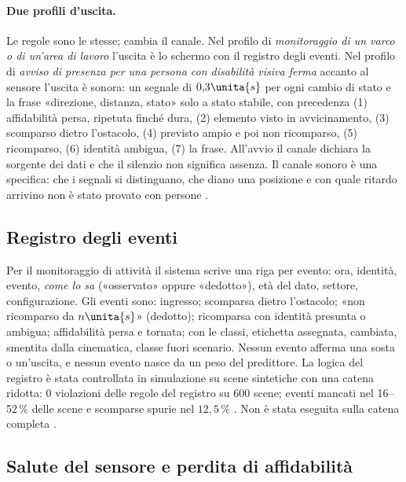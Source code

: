 \paragraph{Due profili d'uscita.} Le regole sono le stesse; cambia il canale. Nel profilo di \emph{monitoraggio di un varco o di un'area di lavoro} l'uscita è lo schermo con il registro degli eventi. Nel profilo di \emph{avviso di presenza per una persona con disabilità visiva ferma} accanto al sensore l'uscita è sonora: un segnale di $0{,}3\unita{s}$ per ogni cambio di stato e la frase «direzione, distanza, stato» solo a stato stabile, con precedenza (1) affidabilità persa, ripetuta finché dura, (2) elemento visto in avvicinamento, (3) scomparso dietro l'ostacolo, (4) previsto ampio e poi non ricomparso, (5) ricomparso, (6) identità ambigua, (7) la frase. All'avvio il canale dichiara la sorgente dei dati e che il silenzio non significa assenza. Il canale sonoro è una specifica: che i segnali si distinguano, che diano una posizione e con quale ritardo arrivino non è stato provato con persone .

\subsection{Registro degli eventi}\label{sec:lim-registro}

Per il monitoraggio di attività il sistema scrive una riga per evento: ora, identità, evento, \emph{come lo sa} («osservato» oppure «dedotto»), età del dato, settore, configurazione. Gli eventi sono: ingresso; scomparsa dietro l'ostacolo; «non ricomparso da $n\unita{s}$» (dedotto); ricomparsa con identità presunta o ambigua; affidabilità persa e tornata; con le classi, etichetta assegnata, cambiata, smentita dalla cinematica, classe fuori scenario. Nessun evento afferma una sosta o un'uscita, e nessun evento nasce da un peso del predittore. La logica del registro è stata controllata in simulazione su scene sintetiche con una catena ridotta: 0 violazioni delle regole del registro su 600 scene; eventi mancati nel 16--52\,\% delle scene e scomparse spurie nel $12{,}5\,\%$ . Non è stata eseguita sulla catena completa .

\subsection{Salute del sensore e perdita di affidabilità}\label{sec:lim-salute}

